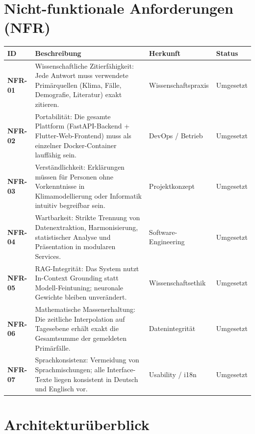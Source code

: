 \documentclass[11pt,a4paper]{article}
\begin{document}
\section{Nicht-funktionale Anforderungen (NFR)}

\begin{longtable}{@{}>{\bfseries}p{1.6cm} L{7.4cm} L{3.6cm} L{2.4cm}@{}}
\toprule
ID & Beschreibung & Herkunft & Status \\
\midrule
\endhead
NFR-01 & Wissenschaftliche Zitierf\"ahigkeit: Jede Antwort muss verwendete Prim\"arquellen (Klima, F\"alle, Demografie, Literatur) exakt zitieren. & Wissenschafts\-praxis & Umgesetzt \\
NFR-02 & Portabilit\"at: Die gesamte Plattform (FastAPI-Backend + Flutter-Web-Frontend) muss als einzelner Docker-Container lauff\"ahig sein. & DevOps / Betrieb & Umgesetzt \\
NFR-03 & Verst\"andlichkeit: Erkl\"arungen m\"ussen f\"ur Personen ohne Vorkenntnisse in Klimamodellierung oder Informatik intuitiv begreifbar sein. & Projektkonzept & Umgesetzt \\
NFR-04 & Wartbarkeit: Strikte Trennung von Datenextraktion, Harmonisierung, statistischer Analyse und Pr\"asentation in modularen Services. & Software-Engineering & Umgesetzt \\
NFR-05 & RAG-Integrit\"at: Das System nutzt In-Context Grounding statt Modell-Feintuning; neuronale Gewichte bleiben unver\"andert. & Wissenschafts\-ethik & Umgesetzt \\
NFR-06 & Mathematische Massenerhaltung: Die zeitliche Interpolation auf Tagesebene erh\"alt exakt die Gesamtsumme der gemeldeten Prim\"arf\"alle. & Datenintegrit\"at & Umgesetzt \\
NFR-07 & Sprachkonsistenz: Vermeidung von Sprachmischungen; alle Interface-Texte liegen konsistent in Deutsch und Englisch vor. & Usability / i18n & Umgesetzt \\
\bottomrule
\end{longtable}

\section{Architektur\"uberblick}
\end{document}
